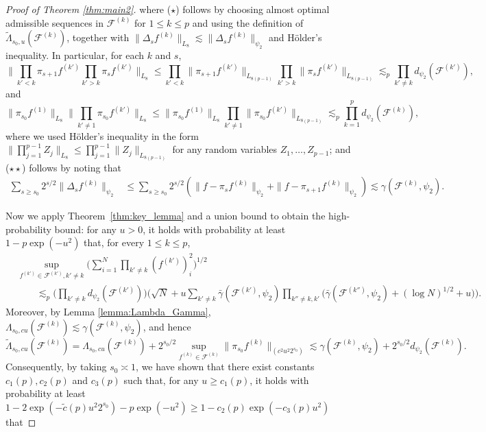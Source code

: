 \documentclass[numbers,webpdf,imaiai]{ima-authoring-template}
\theoremstyle{thmstyletwo}%
\numberwithin{equation}{section}
\numberwithin{equation}{section}
\newcommand{\F}{\mathcal{F}}
\begin{document}
\begin{proof}[Proof of Theorem \ref{thm:main2}]
where ($\star$) follows by choosing almost optimal admissible sequences in $\F^{(k)}$ for $1\le k\le p$ and using the definition of $\widetilde{\Lambda}_{s_0,u}(\F^{(k)})$, together with $\|\Delta_s f^{(k)}\|_{L_8}\lesssim \|\Delta_s f^{(k)}\|_{\psi_2}$ and H\"older's inequality. In particular, for each $k$ and $s$,
\[
\bigg\|\prod_{k'<k}\pi_{s+1} f^{(k')}\prod_{k'>k}\pi_{s} f^{(k')}\bigg\|_{L_8}\le \prod_{k'<k}  \|\pi_{s+1} f^{(k')}\|_{L_{8(p-1)}}  \prod_{k'>k} \|\pi_{s}f^{(k')}\|_{L_{8(p-1)}} \lesssim_p \prod_{k'\ne k} d_{\psi_2}(\F^{(k')}),
\]
and
\[
\|\pi_{s_0}f^{(1)}\|_{L_8} \bigg\|\prod_{k'\ne 1} \pi_{s_0}f^{(k')}\bigg\|_{L_8}\le \|\pi_{s_0}f^{(1)}\|_{L_8} \prod_{k'\ne 1} \|\pi_{s_0}f^{(k')}\|_{L_{8(p-1)}}\lesssim_p \prod_{k=1}^{p} d_{\psi_2}(\F^{(k)}),
\]
where we used Hölder's inequality in the form $   \big\|\prod_{j=1}^{p-1}Z_j\big\|_{L_8}\le \prod_{j=1}^{p-1} \|Z_j\|_{L_{8(p-1)}}$ for any random variables $Z_1,\ldots,Z_{p-1}$; and ($\star\star$) follows by noting that
\begin{align*}
\sum_{s\ge s_0} 2^{s/2}\|\Delta_s f^{(k)}\|_{\psi_2}&\le \sum_{s\ge s_0} 2^{s/2}(\|f-\pi_{s}f^{(k)}\|_{\psi_2}+\|f-\pi_{s+1}f^{(k)}\|_{\psi_2}) \lesssim \gamma(\F^{(k)},\psi_2).
\end{align*}

Now we apply Theorem~\ref{thm:key_lemma} and a union bound to obtain the high-probability bound: for any $u>0$, it holds with probability at least $1-p\exp(-u^2)$ that, for every $1\le k\le p$,
\begin{align*}
 &\sup_{f^{(k')}\in \F^{(k')},k'\ne k}\bigg(\sum_{i=1}^{N} \prod_{k'\ne k} (f^{(k')})^2_{i}\bigg)^{1/2}\\
 &\qquad \lesssim_p  \bigg(\prod_{k'\ne k} d_{\psi_2}(\F^{(k')})\bigg)  \bigg(\sqrt{N}+u\sum_{k'\ne k} \bar{\gamma}(\F^{(k')},\psi_2)\prod_{k''\ne k,k'}\Big(\bar{\gamma}(\F^{(k'')},\psi_2)+(\log N)^{1/2}+u\Big)\bigg).
\end{align*}
Moreover, by Lemma \ref{lemma:Lambda_Gamma}, $ \Lambda_{s_0, cu}(\F^{(k)}) \lesssim \gamma(\F^{(k)}, \psi_2)$, and hence 
\[
\widetilde{\Lambda}_{s_0,cu}(\F^{(k)})=\Lambda_{s_0, cu}(\F^{(k)})+2^{s_0 / 2} \sup_{f^{(k)} \in \F^{(k)}}\|\pi_{s_0} f^{(k)}\|_{(c^2 u^2 2^{s_0})}\lesssim \gamma(\F^{(k)},\psi_2)+2^{s_0/2}d_{\psi_2}(\F^{(k)}).
\]
Consequently, by taking $s_0\asymp 1$, we have shown that there exist constants $c_1(p), c_2(p)$ and $c_3(p)$ such that, for any $u\ge c_1(p)$, it holds with probability at least $1-2\exp(-\tilde{c}(p)u^2 2^{s_0})-p\exp(-u^2)\ge 1-c_2(p)\exp(-c_3(p)u^2)$ that


\end{proof}
\end{document}
